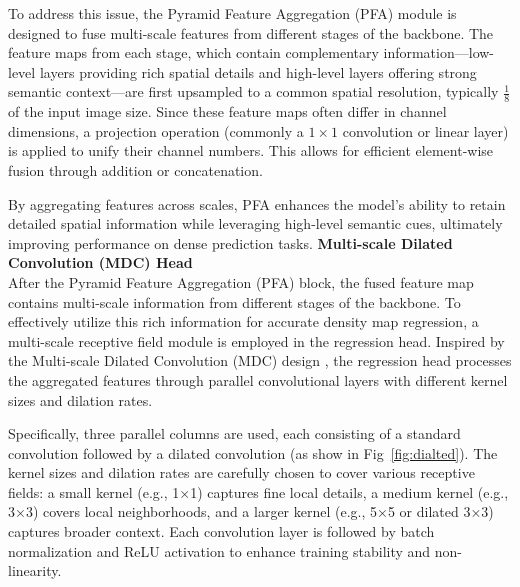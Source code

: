 To address this issue, the Pyramid Feature Aggregation (PFA) module is designed to fuse multi-scale features from different stages of the backbone. The feature maps from each stage, which contain complementary information—low-level layers providing rich spatial details and high-level layers offering strong semantic context—are first upsampled to a common spatial resolution, typically \( \frac{1}{8} \) of the input image size. Since these feature maps often differ in channel dimensions, a projection operation (commonly a \(1 \times 1\) convolution or linear layer) is applied to unify their channel numbers. This allows for efficient element-wise fusion through addition or concatenation.

By aggregating features across scales, PFA enhances the model's ability to retain detailed spatial information while leveraging high-level semantic cues, ultimately improving performance on dense prediction tasks.
\textbf{Multi-scale Dilated Convolution (MDC) Head}\\
After the Pyramid Feature Aggregation (PFA) block, the fused feature map contains multi-scale information from different stages of the backbone. To effectively utilize this rich information for accurate density map regression, a multi-scale receptive field module is employed in the regression head. Inspired by the Multi-scale Dilated Convolution (MDC) design \cite{li2018csrnet, chen2018encoder}, the regression head processes the aggregated features through parallel convolutional layers with different kernel sizes and dilation rates.

Specifically, three parallel columns are used, each consisting of a standard convolution followed by a dilated convolution (as show in Fig~\ref{fig:dialted}). The kernel sizes and dilation rates are carefully chosen to cover various receptive fields: a small kernel (e.g., 1×1) captures fine local details, a medium kernel (e.g., 3×3) covers local neighborhoods, and a larger kernel (e.g., 5×5 or dilated 3×3) captures broader context. Each convolution layer is followed by batch normalization and ReLU activation to enhance training stability and non-linearity.

